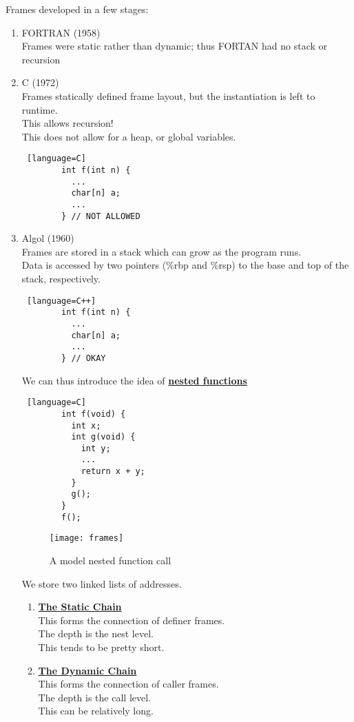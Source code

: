 \documentclass[../../lecture_notes.tex]{subfiles}
\begin{document}
\noindent Frames developed in a few stages:
\begin{enumerate} [itemsep=0mm]
	\item FORTRAN (1958)\\
		Frames were static rather than dynamic; thus FORTAN had no stack or recursion
	\item C (1972) \\
		Frames statically defined frame layout, but the instantiation is left to runtime.\\
		This allows recursion!\\
		This does not allow for a heap, or global variables.
		\begin{lstlisting} [language=C]
		int f(int n) {
		  ... 
		  char[n] a; 
		  ...
		} // NOT ALLOWED
		\end{lstlisting}
	\item Algol (1960)\\
		Frames are stored in a stack which can grow as the program runs.\\
		Data is accessed by two pointers (\%rbp and \%rsp) to the base and top of the stack, respectively.
		\begin{lstlisting} [language=C++]
		int f(int n) {
		  ... 
		  char[n] a; 
		  ...
		} // OKAY
		\end{lstlisting}
		We can thus introduce the idea of \textbf{\underline{nested functions}}\\
		\begin{lstlisting} [language=C]
		int f(void) {
		  int x;
		  int g(void) {
		    int y;
		    ...
		    return x + y;
		  }
		  g();
		}
		f();
		\end{lstlisting}
	
		\begin{figure}[H]
			\centering
			\texttt{[image: frames]}
			\caption{A model nested function call}
			\label{fig:test}
		\end{figure}

		We store two linked lists of addresses.
		\begin{enumerate} [itemsep=0mm]
			\item \textbf{\underline{The Static Chain}}\\
				This forms the connection of definer frames.\\
				The depth is the nest level.\\
				This tends to be pretty short.
			\item \textbf{\underline{The Dynamic Chain}}\\
				This forms the connection of caller frames.\\
				The depth is the call level.\\
				This can be relatively long.
		\end{enumerate}


\end{enumerate}
\end{document}
